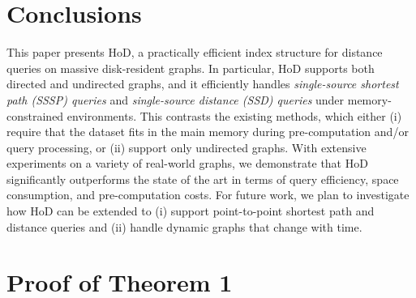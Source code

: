 \documentclass{sig-alternate}
\begin{document}
\begin{sloppy}
\section{Conclusions}\label{sec:conclu}


This paper presents HoD, a practically efficient index structure for distance queries on massive disk-resident graphs. In particular, HoD supports both directed and undirected graphs, and it efficiently handles {\em single-source shortest path (SSSP) queries} and {\em single-source distance (SSD) queries} under memory-constrained environments. This contrasts the existing methods, which either (i) require that the dataset fits in the main memory during pre-computation and/or query processing, or (ii) support only undirected graphs. With extensive experiments on a variety of real-world graphs, we demonstrate that HoD significantly outperforms the state of the art in terms of query efficiency, space consumption, and pre-computation costs. For future work, we plan to investigate how HoD can be extended to (i) support point-to-point shortest path and distance queries and (ii) handle dynamic graphs that change with time.



\balance






%




\appendix

\section{Proof of Theorem 1} \label{sec:proofs}


\end{sloppy}
\end{document}
